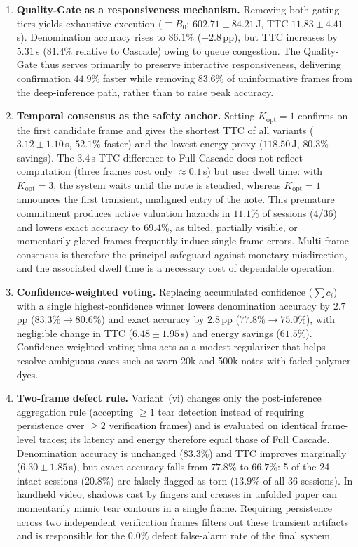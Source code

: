 \documentclass[final,5p,times,twocolumn,authoryear]{elsarticle}
\begin{document}
\begin{enumerate}[label=(\roman*)]
    \item \textbf{Quality-Gate as a responsiveness mechanism.} Removing both gating tiers yields exhaustive execution ($\equiv B_0$; $602.71 \pm 84.21$\,J, TTC $11.83 \pm 4.41$\,s). Denomination accuracy rises to $86.1\%$ ($+2.8$\,pp), but TTC increases by $5.31$\,s ($81.4\%$ relative to Cascade) owing to queue congestion. The Quality-Gate thus serves primarily to preserve interactive responsiveness, delivering confirmation $44.9\%$ faster while removing $83.6\%$ of uninformative frames from the deep-inference path, rather than to raise peak accuracy.
    \item \textbf{Temporal consensus as the safety anchor.} Setting $K_{\text{opt}} = 1$ confirms on the first candidate frame and gives the shortest TTC of all variants ($3.12 \pm 1.10$\,s, $52.1\%$ faster) and the lowest energy proxy ($118.50$\,J, $80.3\%$ savings). The $3.4$\,s TTC difference to Full Cascade does not reflect computation (three frames cost only $\approx 0.1$\,s) but user dwell time: with $K_{\text{opt}} = 3$, the system waits until the note is steadied, whereas $K_{\text{opt}} = 1$ announces the first transient, unaligned entry of the note. This premature commitment produces active valuation hazards in $11.1\%$ of sessions (4/36) and lowers exact accuracy to $69.4\%$, as tilted, partially visible, or momentarily glared frames frequently induce single-frame errors. Multi-frame consensus is therefore the principal safeguard against monetary misdirection, and the associated dwell time is a necessary cost of dependable operation.
    \item \textbf{Confidence-weighted voting.} Replacing accumulated confidence ($\sum c_i$) with a single highest-confidence winner lowers denomination accuracy by $2.7$\,pp ($83.3\% \to 80.6\%$) and exact accuracy by $2.8$\,pp ($77.8\% \to 75.0\%$), with negligible change in TTC ($6.48 \pm 1.95$\,s) and energy savings ($61.5\%$). Confidence-weighted voting thus acts as a modest regularizer that helps resolve ambiguous cases such as worn 20k and 500k notes with faded polymer dyes.
    \item \textbf{Two-frame defect rule.} Variant~(vi) changes only the post-inference aggregation rule (accepting $\ge 1$ tear detection instead of requiring persistence over $\ge 2$ verification frames) and is evaluated on identical frame-level traces; its latency and energy therefore equal those of Full Cascade. Denomination accuracy is unchanged ($83.3\%$) and TTC improves marginally ($6.30 \pm 1.85$\,s), but exact accuracy falls from $77.8\%$ to $66.7\%$: 5 of the 24 intact sessions ($20.8\%$) are falsely flagged as torn ($13.9\%$ of all 36 sessions). In handheld video, shadows cast by fingers and creases in unfolded paper can momentarily mimic tear contours in a single frame. Requiring persistence across two independent verification frames filters out these transient artifacts and is responsible for the $0.0\%$ defect false-alarm rate of the final system.
\end{enumerate}
\end{document}
